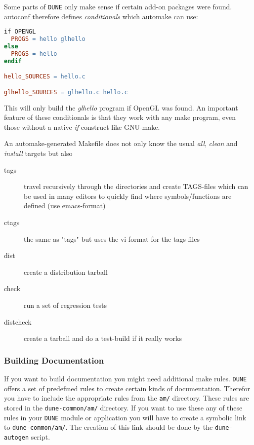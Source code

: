 \documentclass[11pt,a4paper,headinclude,footinclude,DIV16,normalheadings]{scrartcl}
\newcommand{\dune}{\texttt{DUNE}\xspace}
\newcommand{\autogen}{\texttt{dune-autogen}\xspace}
\begin{document}

Some parts of \dune only make sense if certain add-on packages were
found. autoconf therefore defines {\em conditionals} which automake can
use:

\begin{lstlisting}[language=make]
if OPENGL
  PROGS = hello glhello
else
  PROGS = hello
endif

hello_SOURCES = hello.c

glhello_SOURCES = glhello.c hello.c
\end{lstlisting}

This will only build the {\em glhello} program if OpenGL was found. An
important feature of these conditionals is that they work with any
make program, even those without a native {\em if} construct like GNU-make.


An automake-generated Makefile does not only know the usual {\em all},
{\em clean} and {\em install} targets but also
\begin{description}
\item [tags] travel recursively through the directories and create
  TAGS-files which can be used in many editors to quickly find where
  symbols/functions are defined (use emacs-format)
\item [ctags] the same as "tags" but uses the vi-format for the tags-files
\item [dist] create a distribution tarball
\item [check] run a set of regression tests
\item [distcheck] create a tarball and do a test-build if it really works
\end{description}

\subsubsection{Building Documentation}
\label{am_includes}

If you want to build documentation you might need additional make
rules. \dune offers a set of predefined rules to create certain kinds
of documentation. Therefor you have to include the appropriate rules
from the \texttt{am/} directory. These rules are stored in the
\texttt{dune-common/am/} directory. If you want to use these any of
these rules in your \dune module or application you will have to
create a symbolic link to \texttt{dune-common/am/}. The creation of
this link should be done by the \autogen script.
\end{document}
